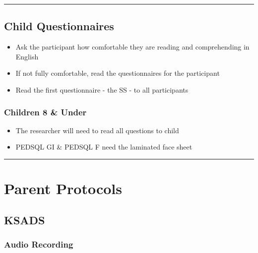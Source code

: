 \documentclass[]{book}
\providecommand{\tightlist}{%
  \setlength{\itemsep}{0pt}\setlength{\parskip}{0pt}}
\begin{document}
\begin{center}\rule{0.5\linewidth}{0.5pt}\end{center}

\hypertarget{child-questionnaires}{%
\subsection{Child Questionnaires}\label{child-questionnaires}}

\begin{itemize}
\tightlist
\item
  Ask the participant how comfortable they are reading and comprehending in English
\item
  If not fully comfortable, read the questionnaires for the participant
\item
  Read the first questionnaire - the SS - to all participants
\end{itemize}

\hypertarget{children-8-under}{%
\subsubsection{Children 8 \& Under}\label{children-8-under}}

\begin{itemize}
\tightlist
\item
  The researcher will need to read all questions to child
\item
  PEDSQL GI \& PEDSQL F need the laminated face sheet
\end{itemize}

\begin{center}\rule{0.5\linewidth}{0.5pt}\end{center}

\hypertarget{parent-protocols}{%
\section{Parent Protocols}\label{parent-protocols}}

\hypertarget{ksads}{%
\subsection{KSADS}\label{ksads}}

\hypertarget{audio-recording}{%
\subsubsection{Audio Recording}\label{audio-recording}}
\end{document}
